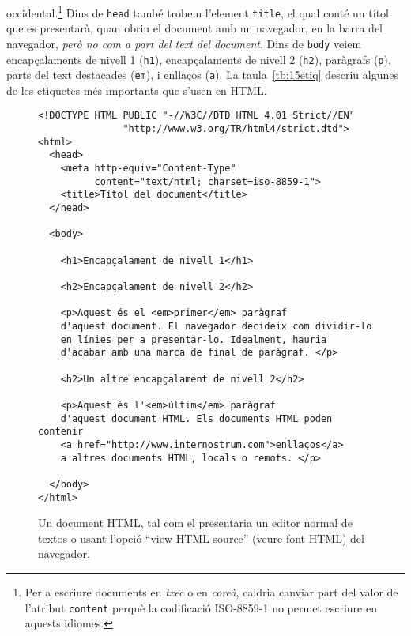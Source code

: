 occidental.\footnote{Per a escriure documents en \emph{txec} o en
  \emph{coreà}, caldria canviar part del valor de l'atribut
  \texttt{content} perquè la codificació ISO-8859-1 no permet escriure
  en aquests idiomes.} Dins de \texttt{head} també trobem l'element
\texttt{title}, el qual conté un títol que es presentarà, quan obriu
el document amb un navegador, en la barra del navegador, \emph{però no
  com a part del text del document}. Dins de \texttt{body} veiem
encapçalaments de nivell 1 (\texttt{h1}), encapçalaments de nivell 2
(\texttt{h2}), paràgrafs (\texttt{p}), parts del text destacades
(\texttt{em}), i enllaços (\texttt{a}). La taula~\ref{tb:15etiq} descriu algunes de les etiquetes més importants que s'usen en HTML.

\begin{figure}
\begin{center}
\begin{verbatim}
<!DOCTYPE HTML PUBLIC "-//W3C//DTD HTML 4.01 Strict//EN"
               "http://www.w3.org/TR/html4/strict.dtd">
<html>
  <head>
    <meta http-equiv="Content-Type"
          content="text/html; charset=iso-8859-1">
    <title>Títol del document</title>
  </head>

  <body>

    <h1>Encapçalament de nivell 1</h1>

    <h2>Encapçalament de nivell 2</h2>

    <p>Aquest és el <em>primer</em> paràgraf 
    d'aquest document. El navegador decideix com dividir-lo 
    en línies per a presentar-lo. Idealment, hauria 
    d'acabar amb una marca de final de paràgraf. </p>

    <h2>Un altre encapçalament de nivell 2</h2>

    <p>Aquest és l'<em>últim</em> paràgraf 
    d'aquest document HTML. Els documents HTML poden contenir 
    <a href="http://www.internostrum.com">enllaços</a> 
    a altres documents HTML, locals o remots. </p>

  </body>
</html>
\end{verbatim}
\end{center}
\caption{Un document HTML, tal com el presentaria un editor normal de
  textos o usant l'opció ``view HTML source'' (veure font HTML) del
  navegador. 
  }
\label{fg:HTML}
\end{figure}

